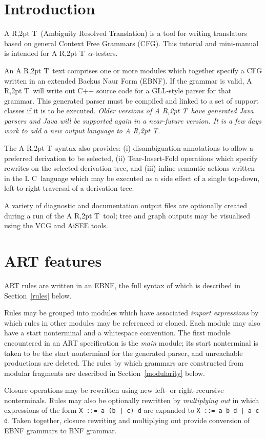 \documentclass[11pt]{article}
\newcommand{\lc}{{\rm L\kern-2.5pt C}}
\newcommand{\art}{{\rm A\kern -2pt R\kern -2,2pt T}}
\begin{document}
\section{Introduction}
\art\ (Ambiguity Resolved Translation) is a tool for writing translators
based on general Context Free Grammars (CFG). This tutorial and mini-manual is
intended for \art\ $\alpha$-testers.

An \art\ text comprises one or more modules which together specify a CFG
written in an extended Backus Naur Form (EBNF). If the grammar is
valid, \art\ will write out C++ source code for a GLL-style parser for
that grammar. This generated parser must be compiled and linked to a
set of support classes if it is to be executed. {\em Older versions of \art\
have generated Java parsers and Java will be supported again in a
near-future version. It is a few days work to add a new output
language to \art.}

The \art\ syntax also provides: (i) disambiguation annotations to allow
a preferred derivation to be selected, (ii) Tear-Insert-Fold
operations which specify rewrites on the selected derivation tree, and
(iii) inline semantic actions written in the \lc\ language which may be
executed as a side effect of a single top-down, left-to-right
traversal of a derivation tree.

A variety of diagnostic and documentation output files are optionally
created during a run of the \art\ tool; tree and graph outputs may be
visualised using the VCG and AiSEE tools.

\section{ART features}
ART rules are written in an EBNF, the full syntax of which is described in
Section~\ref{rules} below.

Rules may be grouped into modules which have associated {\em import
  expressions} by which rules in other modules may be referenced or
cloned. Each module may also have a start nonterminal and a whitespace
convention. The first module encountered in an ART specification is
the {\em main} module; its start nonterminal is taken to be the start
nonterminal for the generated parser, and unreachable productions are
deleted. The rules by which grammars are constructed from modular
fragments are described in Section~\ref{modularity} below.

Closure operations may be rewritten using new left- or right-recursive
nonterminals. Rules may also be optionally rewritten by {\em
  multiplying out} in which expressions of the form
\verb+X ::= a (b | c) d+ are expanded to
\verb+X ::= a b d | a c d+. Taken together, closure rewriting and
multiplying out provide conversion of EBNF grammars to BNF grammar.
\end{document}
